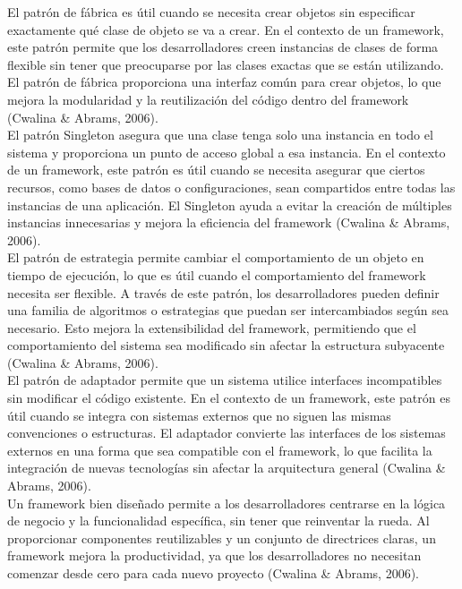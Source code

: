\documentclass[12pt,letterpaper,spanish, xcolor=table]{report}
\numberwithin{figure}{subsection}
\begin{document}
El patrón de fábrica es útil cuando se necesita crear objetos sin especificar exactamente qué clase de objeto se va a crear. En el contexto de un framework, este patrón permite que los desarrolladores creen instancias de clases de forma flexible sin tener que preocuparse por las clases exactas que se están utilizando. El patrón de fábrica proporciona una interfaz común para crear objetos, lo que mejora la modularidad y la reutilización del 
código dentro del framework (Cwalina \& Abrams, 2006).\\

El patrón Singleton asegura que una clase tenga solo una instancia en todo el sistema y proporciona un punto de acceso global a esa instancia. En el contexto de un framework, este patrón es útil cuando se necesita asegurar que ciertos recursos, como bases de datos o configuraciones, sean compartidos entre todas las instancias de una aplicación. El Singleton ayuda a evitar la creación de múltiples instancias innecesarias y mejora la eficiencia del framework (Cwalina \& Abrams, 2006).\\

El patrón de estrategia permite cambiar el comportamiento de un objeto en tiempo de ejecución, lo que es útil cuando el comportamiento del framework necesita ser flexible. A través de este patrón, los desarrolladores pueden definir una familia de algoritmos o estrategias que puedan ser intercambiados según sea necesario. Esto mejora la extensibilidad del framework, permitiendo que el comportamiento del sistema sea modificado sin afectar la estructura subyacente (Cwalina \& Abrams, 2006).\\

El patrón de adaptador permite que un sistema utilice interfaces incompatibles sin modificar el código existente. En el contexto de un framework, este patrón es útil cuando se integra con sistemas externos que no siguen las mismas convenciones o estructuras. El adaptador convierte las interfaces de los sistemas externos en una forma que sea compatible con el framework, lo que facilita la integración de nuevas tecnologías sin afectar la arquitectura general (Cwalina \& Abrams, 2006).\\

Un framework bien diseñado permite a los desarrolladores centrarse en la lógica de negocio y la funcionalidad específica, sin tener que reinventar la rueda. Al proporcionar componentes reutilizables y un conjunto de directrices claras, un framework mejora la productividad, ya que los desarrolladores no necesitan comenzar desde cero para cada nuevo proyecto (Cwalina \& Abrams, 2006).\\
\end{document}
